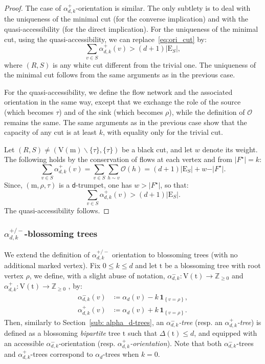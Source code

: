 \documentclass[11pt,reqno,tbtags]{amsart}
\newcommand{\rV}{\mathrm{V}}
\renewcommand{\rm}{\mathrm{m}}
\newcommand{\rt}{\mathrm{t}}
\numberwithin{equation}{section}
\numberwithin{theo}{section}
\theoremstyle{definition}
\newcommand{\cO}{\mathcal{O}}
\newcommand{\dtrum}{$\mathsf{d}$-trumpet}
\begin{document}
\begin{proof}
The case of $\alpha_{d,k}^+$-orientation is similar. The only subtlety is to deal with the uniqueness of the minimal cut (for the converse implication) and with the quasi-accessibility (for  the direct implication). For the uniqueness of the minimal cut, using the quasi-accessibility, we can replace~\eqref{eq:ori_cut} by: 
\[
\sum_{v\in S}\alpha_{d,k}^+(v)  > \left(d+1\right) \vert\mathrm{E}_S\vert,
\]
where $(R,S)$ is any white cut different from the trivial one. The uniqueness of the minimal cut follows from the same arguments as in the previous case. 

For the quasi-accessibility, we define the flow network and the associated orientation in the same way, except that we exchange the role of the source (which becomes $\tau$) and of the sink (which becomes $\rho$), while the definition of $\cO$ remains the same. The same arguments as in the previous case show that the capacity of any cut is at least $k$, with equality only for the trivial cut.

Let $(R,S)\neq (\rV(\rm)\backslash\{\tau\},\{\tau\})$ be a black cut, and let $w$ denote its weight. The following holds by the conservation of flows at each vertex and from $\vert F^\star\vert = k$:
\begin{equation*}
	\sum_{v\in S}\alpha_{d,k}^+(v) = \sum_{v\in S}\sum_{h\sim v} \cO(h) = \left(d+1\right) \vert\mathrm{E}_S\vert + w - \vert F^\star\vert.
\end{equation*}
Since, $(\rm,\rho,\tau)$ is a \dtrum, one has $w>\vert F^\star\vert$, so that:
\begin{equation*}
	\sum_{v\in S}\alpha_{d,k}^+(v) > \left(d+1\right) \vert\mathrm{E}_S\vert.
\end{equation*}
The quasi-accessibility follows. 
\end{proof}


\subsubsection{$\alpha_{d,k}^{+/-}$-blossoming trees } \label{sec:alphadktrees}
We extend the definition of $\alpha_{d,k}^{+/-}$ orientation to blossoming trees (with no additional marked vertex). Fix $0\leq k \leq d$ and let $\rt$ be a blossoming tree with root vertex $\rho$, we define, with a slight abuse of notation, $\alpha_{d,k}^-: \mathrm{V}(\rt)\rightarrow \mathbb{Z}_{\geq 0}$ and $\alpha_{d,k}^+ : \mathrm{V}(\rt)\rightarrow \mathbb{Z}_{\geq 0}$ , by: 
\begin{align}\label{eq: alphadk for trees}
\alpha_{d,k}^-(v) &\coloneqq \alpha_{d}(v) - k\,\mathbf{1}_{\left\{v=\rho\right\}}, \\ \alpha_{d,k}^+(v) &\coloneqq \alpha_{d}(v) + k\,\mathbf{1}_{\left\{v=\rho\right\}}.
\end{align}
Then, similarly to Section~\ref{sub: alpha_d-trees}, an \emph{$\alpha_{d,k}^-$-tree} (resp. an \emph{$\alpha_{d,k}^+$-tree}) is defined as a blossoming \emph{bipartite} tree $\rt$ such that $\Delta(\rt)\leq d$, and equipped with an accessible $\alpha_{d,k}^-$-orientation (resp. \emph{$\alpha_{d,k}^+$-orientation}). Note that both $\alpha_{d,k}^-$-trees and $\alpha_{d,k}^+$-trees correspond to $\alpha_d$-trees when $k=0$. 
\end{document}
